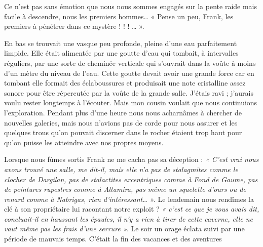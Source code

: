 Ce n’est pas sans émotion que nous nous sommes engagés sur la pente raide mais facile à
descendre, nous les premiers hommes… « Pense un peu, Frank, les premiers à pénétrer dans
ce mystère ! ! ! … ».

En bas se trouvait une vasque peu profonde, pleine d’une eau parfaitement limpide. Elle était
alimentée par une goutte d’eau qui tombait, à intervalles réguliers, par une sorte de cheminée
verticale qui s’ouvrait dans la voûte à moins d’un mètre du niveau de l’eau. Cette goutte
devait avoir une grande force car en tombant elle formait des éclaboussures et produisait une
note cristalline assez sonore pour être répercutée par la voûte de la grande salle. J’étais ravi ;
j’aurais voulu rester longtemps à l’écouter. Mais mon cousin voulait que nous continuions
l’exploration. Pendant plus d’une heure nous nous acharnâmes à chercher de nouvelles
galeries, mais nous n’avions pas de corde pour nous assurer et les quelques trous qu’on
pouvait discerner dans le rocher étaient trop haut pour qu’on puisse les atteindre avec nos
propres moyens.

Lorsque nous fûmes sortis Frank ne me cacha pas sa déception : \textit{« C’est vrai nous avons
trouvé une salle, me dit-il, mais elle n’a pas de stalagmites comme le clocher de Dargilan,
pas de stalactites excentriques comme à Fond de Gaume, pas de peintures rupestres comme à
Altamira, pas même un squelette d’ours ou de renard comme à Nabrigas, rien
d’intéressant… ».}
Le lendemain nous rendîmes la clé à son propriétaire lui racontant notre exploit ? \textit{« c’est ce
que je vous avais dit, concluait-il en haussant les épaules, il n’y a rien à tirer de cette
caverne, elle ne vaut même pas les frais d’une serrure ».}
Le soir un orage éclata suivi par une période de mauvais temps. C’était la fin des vacances et
des aventures
